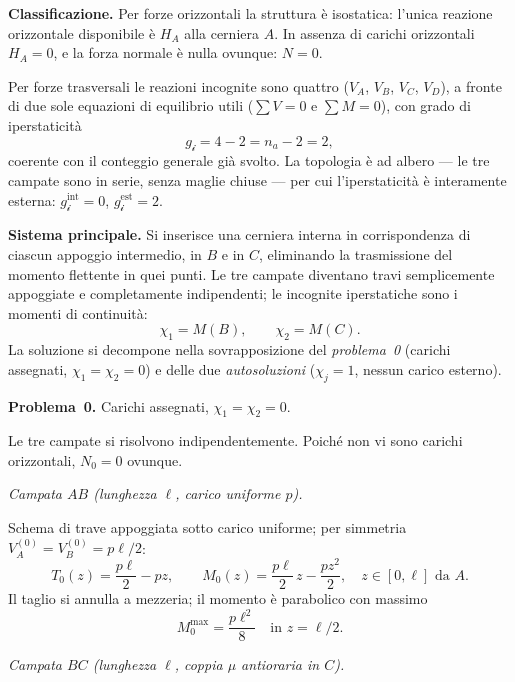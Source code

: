 


\medskip
\noindent\textbf{Classificazione.}
Per forze orizzontali la struttura è isostatica: l'unica
reazione orizzontale disponibile è $H_A$ alla cerniera $A$.
In assenza di carichi orizzontali $H_A = 0$, e la forza
normale è nulla ovunque: $N = 0$.

Per forze trasversali le reazioni incognite sono quattro
($V_A$, $V_B$, $V_C$, $V_D$), a fronte di due sole equazioni
di equilibrio utili ($\sum V = 0$ e $\sum M = 0$), con
grado di iperstaticità
\[
g_\mathscr{i} = 4 - 2 = n_a - 2 = 2,
\]
coerente con il conteggio generale già svolto.
La topologia è ad albero --- le tre campate sono in serie,
senza maglie chiuse --- per cui l'iperstaticità è interamente
esterna: $g_\mathscr{i}^{\mathrm{int}} = 0$,
$g_\mathscr{i}^{\mathrm{est}} = 2$.

\medskip
\noindent\textbf{Sistema principale.}
Si inserisce una cerniera interna in corrispondenza di
ciascun appoggio intermedio, in $B$ e in $C$, eliminando
la trasmissione del momento flettente in quei punti.
Le tre campate diventano travi semplicemente appoggiate e
completamente indipendenti; le incognite iperstatiche sono
i momenti di continuità:
\[
\chi_1 = M(B), \qquad \chi_2 = M(C).
\]
La soluzione si decompone nella sovrapposizione del
\emph{problema~0} (carichi assegnati, $\chi_1 = \chi_2 = 0$)
e delle due \emph{autosoluzioni}
($\chi_j = 1$, nessun carico esterno).

\medskip
\noindent\textbf{Problema~0.}
Carichi assegnati, $\chi_1 = \chi_2 = 0$.

Le tre campate si risolvono indipendentemente.
Poiché non vi sono carichi orizzontali, $N_0 = 0$ ovunque.

\medskip
\noindent\textit{Campata $AB$
(lunghezza $\ell$, carico uniforme $p$).}

Schema di trave appoggiata sotto carico uniforme;
per simmetria $V_A^{(0)} = V_B^{(0)} = p\ell/2$:
\[
T_0(z) = \frac{p\ell}{2} - pz, \qquad
M_0(z) = \frac{p\ell}{2}\,z - \frac{pz^2}{2},
\quad z \in [0,\ell] \text{ da } A.
\]
Il taglio si annulla a mezzeria; il momento è parabolico
con massimo
\[
M_0^{\max} = \frac{p\ell^2}{8} \quad \text{in } z = \ell/2.
\]

\medskip
\noindent\textit{Campata $BC$
(lunghezza $\ell$, coppia $\mu$ antioraria in $C$).}

